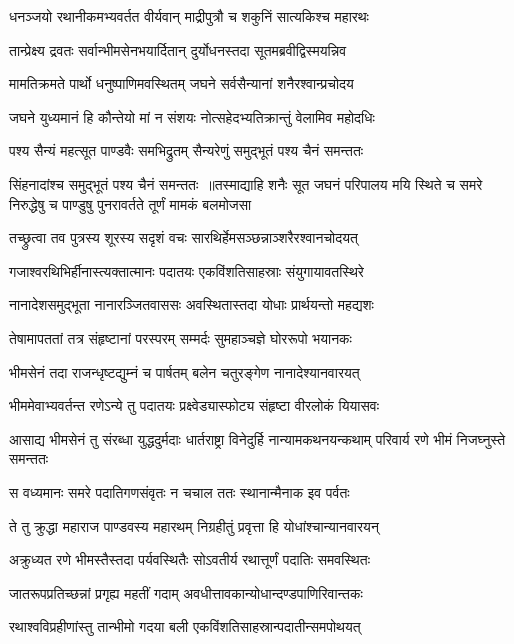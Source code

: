 \twolineshloka
{धनञ्जयो रथानीकमभ्यवर्तत वीर्यवान्}
{माद्रीपुत्रौ च शकुनिं सात्यकिश्च महारथः}


\twolineshloka
{तान्प्रेक्ष्य द्रवतः सर्वान्भीमसेनभयार्दितान्}
{दुर्योधनस्तदा सूतमब्रवीद्विस्मयन्निव}


\twolineshloka
{मामतिक्रमते पार्थो धनुष्पाणिमवस्थितम्}
{जघने सर्वसैन्यानां शनैरश्वान्प्रचोदय}


\twolineshloka
{जघने युध्यमानं हि कौन्तेयो मां न संशयः}
{नोत्सहेदभ्यतिक्रान्तुं वेलामिव महोदधिः}


\twolineshloka
{पश्य सैन्यं महत्सूत पाण्डवैः समभिद्रुतम्}
{सैन्यरेणुं समुद्भूतं पश्य चैनं समन्ततः}


सिंहनादांश्च समुद्भूतं पश्य चैनं समन्ततः ॥तस्माद्याहि शनैः सूत जघनं परिपालय
\twolineshloka
{मयि स्थिते च समरे निरुद्धेषु च पाण्डुषु}
{पुनरावर्तते तूर्णं मामकं बलमोजसा}


\twolineshloka
{तच्छ्रुत्वा तव पुत्रस्य शूरस्य सदृशं वचः}
{सारथिर्हेमसञ्छन्नाञ्शरैरश्वानचोदयत्}


\twolineshloka
{गजाश्वरथिभिर्हीनास्त्यक्तात्मानः पदातयः}
{एकविंशतिसाहस्राः संयुगायावतस्थिरे}


\twolineshloka
{नानादेशसमुद्भूता नानारञ्जितवाससः}
{अवस्थितास्तदा योधाः प्रार्थयन्तो महद्यशः}


\twolineshloka
{तेषामापततां तत्र संहृष्टानां परस्परम्}
{सम्मर्दः सुमहाञ्चज्ञे घोररूपो भयानकः}


\twolineshloka
{भीमसेनं तदा राजन्धृष्टद्युम्नं च पार्षतम्}
{बलेन चतुरङ्गेण नानादेश्यानवारयत्}


\twolineshloka
{भीममेवाभ्यवर्तन्त रणेऽन्ये तु पदातयः}
{प्रक्ष्वेड्यास्फोट्य संहृष्टा वीरलोकं यियासवः}


\threelineshloka
{आसाद्य भीमसेनं तु संरब्धा युद्धदुर्मदाः}
{धार्तराष्ट्रा विनेदुर्हि नान्यामकथनयन्कथाम्}
{परिवार्य रणे भीमं निजघ्नुस्ते समन्ततः}


\twolineshloka
{स वध्यमानः समरे पदातिगणसंवृतः}
{न चचाल ततः स्थानान्मैनाक इव पर्वतः}


\twolineshloka
{ते तु क्रुद्धा महाराज पाण्डवस्य महारथम्}
{निग्रहीतुं प्रवृत्ता हि योधांश्चान्यानवारयन्}


\twolineshloka
{अक्रुध्यत रणे भीमस्तैस्तदा पर्यवस्थितैः}
{सोऽवतीर्य रथात्तूर्णं पदातिः समवस्थितः}


\twolineshloka
{जातरूपप्रतिच्छन्नां प्रगृह्य महतीं गदाम्}
{अवधीत्तावकान्योधान्दण्डपाणिरिवान्तकः}


\twolineshloka
{रथाश्वविप्रहीणांस्तु तान्भीमो गदया बली}
{एकविंशतिसाहस्रान्पदातीन्समपोथयत्}


